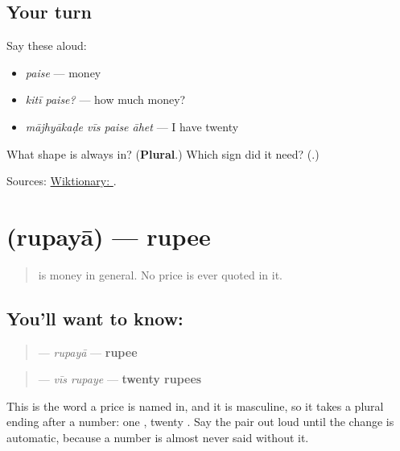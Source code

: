 \subsection*{Your turn}
Say these aloud:

\begin{itemize}
\raggedright
  \item \emph{paise} — money
  \item \emph{kitī paise?} — how much money?
  \item \emph{mājhyākaḍe vīs paise āhet} — I have twenty
\end{itemize}

\begin{tcolorbox}[breakable,colback=teal!4,colframe=teal!35!black,title={Before you move on}]
What shape is \textbf{} always in? (\textbf{Plural}.) Which sign did it need? (\textbf{}.)

Sources: \href{https://en.wiktionary.org/wiki/\%E0\%A4\%AA\%E0\%A5\%88\%E0\%A4\%B8\%E0\%A4\%BE}{Wiktionary: }.
\end{tcolorbox}
\section[\texorpdfstring{\mr{रुपया} (rupayā)}{रुपया (rupayā)}]{ (rupayā) — rupee}

\label{lesson:MR-C59-rupaya}



\begin{quote}
\textbf{} is money in general. No price is ever quoted in it.
\end{quote}

\subsection*{You'll want to know: }
\begin{quote}
\textbf{} — \emph{rupayā} — \textbf{rupee}
\end{quote}

\begin{quote}
\textbf{ } — \emph{vīs rupaye} — \textbf{twenty rupees}
\end{quote}

This is the word a price is named in, and it is masculine, so it takes a plural ending after a number: one \textbf{}, twenty \textbf{}. Say the pair out loud until the change is automatic, because a number is almost never said without it.

